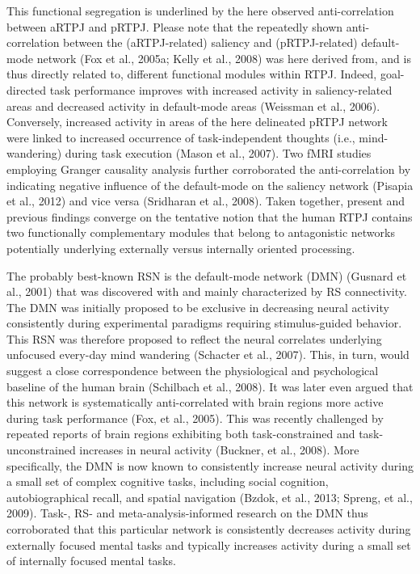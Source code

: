 \documentclass[authoryear,review,3p]{elsarticle}
\begin{document}
This functional segregation is underlined by the here observed anti-correlation between aRTPJ and pRTPJ. Please note that the repeatedly shown anti-correlation between the (aRTPJ-related) saliency and (pRTPJ-related) default-mode network (Fox et al., 2005a; Kelly et al., 2008) was here derived from, and is thus directly related to, different functional modules within RTPJ. Indeed, goal-directed task performance improves with increased activity in saliency-related areas and decreased activity in default-mode areas (Weissman et al., 2006). Conversely, increased activity in areas of the here delineated pRTPJ network were linked to increased occurrence of task-independent thoughts (i.e., mind-wandering) during task execution (Mason et al., 2007). Two fMRI studies employing Granger causality analysis further corroborated the anti-correlation by indicating negative influence of the default-mode on the saliency network (Pisapia et al., 2012) and vice versa (Sridharan et al., 2008). Taken together, present and previous findings converge on the tentative notion that the human RTPJ contains two functionally complementary modules that belong to antagonistic networks potentially underlying externally versus internally oriented processing.

The probably best-known RSN is the default-mode network (DMN) (Gusnard et al., 2001) that was discovered with and mainly characterized by RS connectivity. The DMN was initially proposed to be exclusive in decreasing neural activity consistently during experimental paradigms requiring stimulus-guided behavior. This RSN was therefore proposed to reflect the neural correlates underlying unfocused every-day mind wandering (Schacter et al., 2007). This, in turn, would suggest a close correspondence between the physiological and psychological baseline of the human brain (Schilbach et al., 2008). It was later even argued that this network is systematically anti-correlated with brain regions more active during task performance (Fox, et al., 2005). This was recently challenged by repeated reports of brain regions exhibiting both task-constrained and task-unconstrained increases in neural activity (Buckner, et al., 2008). More specifically, the DMN is now known to consistently increase neural activity during a small set of complex cognitive tasks, including social cognition, autobiographical recall, and spatial navigation (Bzdok, et al., 2013; Spreng, et al., 2009). Task-, RS- and meta-analysis-informed research on the DMN thus corroborated that this particular network is consistently decreases activity during externally focused mental tasks and typically increases activity during a small set of internally focused mental tasks.
\end{document}
